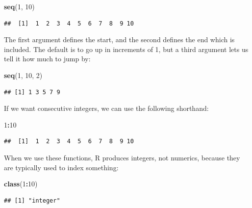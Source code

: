 \documentclass[
]{article}
\newenvironment{Shaded}{\begin{snugshade}}{\end{snugshade}}
\newcommand{\DecValTok}[1]{\textcolor[rgb]{0.00,0.00,0.81}{#1}}
\newcommand{\FunctionTok}[1]{\textcolor[rgb]{0.13,0.29,0.53}{\textbf{#1}}}
\newcommand{\NormalTok}[1]{#1}
\newcommand{\SpecialCharTok}[1]{\textcolor[rgb]{0.81,0.36,0.00}{\textbf{#1}}}
\begin{document}
\begin{Shaded}
\begin{Highlighting}[]
\FunctionTok{seq}\NormalTok{(}\DecValTok{1}\NormalTok{, }\DecValTok{10}\NormalTok{)}
\end{Highlighting}
\end{Shaded}

\begin{verbatim}
##  [1]  1  2  3  4  5  6  7  8  9 10
\end{verbatim}

The first argument defines the start, and the second defines the end
which is included. The default is to go up in increments of 1, but a
third argument lets us tell it how much to jump by:

\begin{Shaded}
\begin{Highlighting}[]
\FunctionTok{seq}\NormalTok{(}\DecValTok{1}\NormalTok{, }\DecValTok{10}\NormalTok{, }\DecValTok{2}\NormalTok{)}
\end{Highlighting}
\end{Shaded}

\begin{verbatim}
## [1] 1 3 5 7 9
\end{verbatim}

If we want consecutive integers, we can use the following shorthand:

\begin{Shaded}
\begin{Highlighting}[]
\DecValTok{1}\SpecialCharTok{:}\DecValTok{10}
\end{Highlighting}
\end{Shaded}

\begin{verbatim}
##  [1]  1  2  3  4  5  6  7  8  9 10
\end{verbatim}

When we use these functions, R produces integers, not numerics, because
they are typically used to index something:

\begin{Shaded}
\begin{Highlighting}[]
\FunctionTok{class}\NormalTok{(}\DecValTok{1}\SpecialCharTok{:}\DecValTok{10}\NormalTok{)}
\end{Highlighting}
\end{Shaded}

\begin{verbatim}
## [1] "integer"
\end{verbatim}
\end{document}
